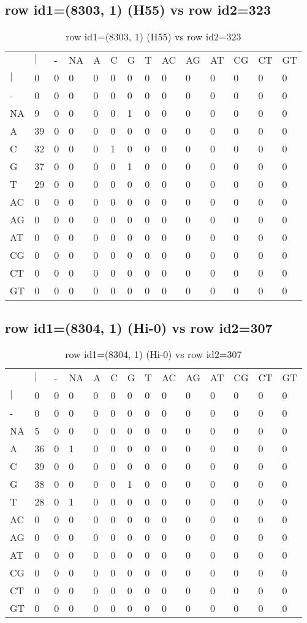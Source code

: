 \subsection{row id1=(8303, 1) (H55) vs row id2=323}
\begin{center}
\begin{longtable}{|l|l|l|l|l|l|l|l|l|l|l|l|l|l|}
\caption{row id1=(8303, 1) (H55) vs row id2=323} \label{table_dm480}\\
\hline
\\
\hline
&$|$&-&NA&A&C&G&T&AC&AG&AT&CG&CT&GT\\
$|$&0&0&0&0&0&0&0&0&0&0&0&0&0\\
-&0&0&0&0&0&0&0&0&0&0&0&0&0\\
NA&9&0&0&0&0&1&0&0&0&0&0&0&0\\
A&39&0&0&0&0&0&0&0&0&0&0&0&0\\
C&32&0&0&0&1&0&0&0&0&0&0&0&0\\
G&37&0&0&0&0&1&0&0&0&0&0&0&0\\
T&29&0&0&0&0&0&0&0&0&0&0&0&0\\
AC&0&0&0&0&0&0&0&0&0&0&0&0&0\\
AG&0&0&0&0&0&0&0&0&0&0&0&0&0\\
AT&0&0&0&0&0&0&0&0&0&0&0&0&0\\
CG&0&0&0&0&0&0&0&0&0&0&0&0&0\\
CT&0&0&0&0&0&0&0&0&0&0&0&0&0\\
GT&0&0&0&0&0&0&0&0&0&0&0&0&0\\
\hline
\end{longtable}
\end{center}

\subsection{row id1=(8304, 1) (Hi-0) vs row id2=307}
\begin{center}
\begin{longtable}{|l|l|l|l|l|l|l|l|l|l|l|l|l|l|}
\caption{row id1=(8304, 1) (Hi-0) vs row id2=307} \label{table_dm482}\\
\hline
\\
\hline
&$|$&-&NA&A&C&G&T&AC&AG&AT&CG&CT&GT\\
$|$&0&0&0&0&0&0&0&0&0&0&0&0&0\\
-&0&0&0&0&0&0&0&0&0&0&0&0&0\\
NA&5&0&0&0&0&0&0&0&0&0&0&0&0\\
A&36&0&1&0&0&0&0&0&0&0&0&0&0\\
C&39&0&0&0&0&0&0&0&0&0&0&0&0\\
G&38&0&0&0&0&1&0&0&0&0&0&0&0\\
T&28&0&1&0&0&0&0&0&0&0&0&0&0\\
AC&0&0&0&0&0&0&0&0&0&0&0&0&0\\
AG&0&0&0&0&0&0&0&0&0&0&0&0&0\\
AT&0&0&0&0&0&0&0&0&0&0&0&0&0\\
CG&0&0&0&0&0&0&0&0&0&0&0&0&0\\
CT&0&0&0&0&0&0&0&0&0&0&0&0&0\\
GT&0&0&0&0&0&0&0&0&0&0&0&0&0\\
\hline
\end{longtable}
\end{center}


